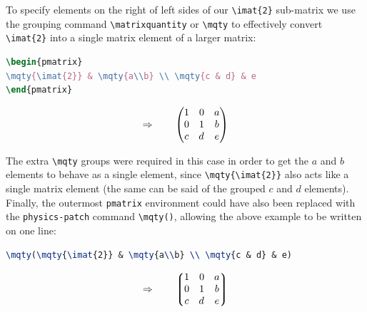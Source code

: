 \documentclass[a4paper,12pt]{article}
\begin{document}
To specify elements on the right of left sides of our \verb|\imat{2}| sub-matrix we use the grouping command \verb|\matrixquantity| or \verb|\mqty| to effectively convert \verb|\imat{2}| into a single matrix element of a larger matrix:

\begin{minipage}{9cm}
\begin{lstlisting}[language=TeX,basicstyle=\ttfamily\normalsize]
\begin{pmatrix}
\mqty{\imat{2}} & \mqty{a\\b} \\ \mqty{c & d} & e
\end{pmatrix}
\end{lstlisting}
\end{minipage}
\begin{minipage}{6cm}
\begin{displaymath}
\Rightarrow\qquad
\begin{pmatrix}
\mqty{\imat{2}} & \mqty{a\\b} \\ \mqty{c & d} & e
\end{pmatrix}
\end{displaymath}
\end{minipage}

The extra \verb|\mqty| groups were required in this case in order to get the $a$ and $b$ elements to behave as a single element, since \verb|\mqty{\imat{2}}| also acts like a single matrix element (the same can be said of the grouped $c$ and $d$ elements). Finally, the outermost \texttt{pmatrix} environment could have also been replaced with the \texttt{physics-patch} command \verb|\mqty()|, allowing the above example to be written on one line:

\begin{minipage}{9cm}
\begin{lstlisting}[language=TeX,basicstyle=\ttfamily\normalsize]
\mqty(\mqty{\imat{2}} & \mqty{a\\b} \\ \mqty{c & d} & e)
\end{lstlisting}
\end{minipage}
\begin{minipage}{6cm}
\begin{displaymath}
\Rightarrow\qquad
\mqty(\mqty{\imat{2}} & \mqty{a\\b} \\ \mqty{c & d} & e)
\end{displaymath}
\end{minipage}
\end{document}
